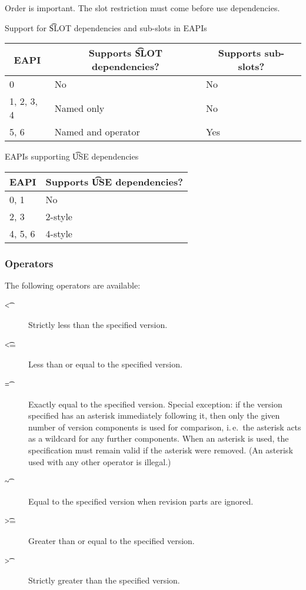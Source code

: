 \note Order is important. The slot restriction must come before use dependencies.

\begin{centertable}{Support for \t{SLOT} dependencies and sub-slots in EAPIs}
    \label{tab:slot-deps-table}
    \begin{tabular}{lll}
      \toprule
      \multicolumn{1}{c}{\textbf{EAPI}} &
      \multicolumn{1}{c}{\textbf{Supports \t{SLOT} dependencies?}} &
      \multicolumn{1}{c}{\textbf{Supports sub-slots?}} \\
      \midrule
      0                 & No                 & No  \\
      1, 2, 3, 4        & Named only         & No  \\
      5, 6              & Named and operator & Yes \\
      \bottomrule
    \end{tabular}
\end{centertable}

\begin{centertable}{EAPIs supporting \t{USE} dependencies}
    \label{tab:use-deps-table}
    \begin{tabular}{ll}
      \toprule
      \multicolumn{1}{c}{\textbf{EAPI}} &
      \multicolumn{1}{c}{\textbf{Supports \t{USE} dependencies?}} \\
      \midrule
      0, 1              & No      \\
      2, 3              & 2-style \\
      4, 5, 6           & 4-style \\
      \bottomrule
    \end{tabular}
\end{centertable}

\subsubsection{Operators}
\label{sec:dep-operator}

The following operators are available:

\begin{description}
\item[\t{<}] Strictly less than the specified version.
\item[\t{<=}] Less than or equal to the specified version.
\item[\t{=}] Exactly equal to the specified version. Special exception: if the version specified
    has an asterisk immediately following it, then only the given number of version components
    is used for comparison, i.\,e.\ the asterisk acts as a wildcard for any further components.
    When an asterisk is used, the specification must remain valid if the asterisk were removed.
    (An asterisk used with any other operator is illegal.)
\item[\t{\textasciitilde}] Equal to the specified version when revision parts are ignored.
\item[\t{>=}] Greater than or equal to the specified version.
\item[\t{>}] Strictly greater than the specified version.
\end{description}

